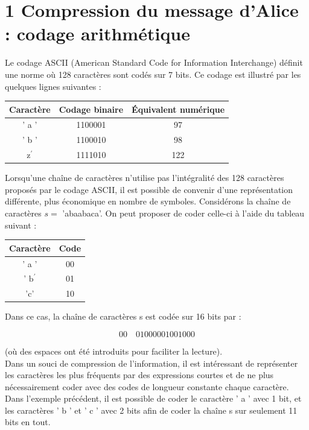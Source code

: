 \documentclass[10pt]{article}
\begin{document}
\section*{1 Compression du message d'Alice : codage arithmétique}
Le codage ASCII (American Standard Code for Information Interchange) définit une norme où 128 caractères sont codés sur 7 bits. Ce codage est illustré par les quelques lignes suivantes :

\begin{center}
\begin{tabular}{|c|c|c|}
\hline
Caractère & Codage binaire & Équivalent numérique \\
\hline
' a ' & 1100001 & 97 \\
\hline
' b ' & 1100010 & 98 \\
\hline
$\mathrm{z}^{\prime}$ & 1111010 & 122 \\
\hline
\end{tabular}
\end{center}

Lorsqu'une chaîne de caractères n'utilise pas l'intégralité des 128 caractères proposés par le codage ASCII, il est possible de convenir d'une représentation différente, plus économique en nombre de symboles. Considérons la chaîne de caractères $s=$ 'abaabaca'. On peut proposer de coder celle-ci à l'aide du tableau suivant :

\begin{center}
\begin{tabular}{|c|c|}
\hline
Caractère & Code \\
\hline
' a ' & 00 \\
\hline
' $\mathrm{b}^{\prime}$ & 01 \\
\hline
'c' & 10 \\
\hline
\end{tabular}
\end{center}

Dans ce cas, la chaîne de caractères s est codée sur 16 bits par :

$$
00 \quad 01000001001000
$$

(où des espaces ont été introduits pour faciliter la lecture).\\
Dans un souci de compression de l'information, il est intéressant de représenter les caractères les plus fréquents par des expressions courtes et de ne plus nécessairement coder avec des codes de longueur constante chaque caractère. Dans l'exemple précédent, il est possible de coder le caractère ' a ' avec 1 bit, et les caractères ' b ' et ' c ' avec 2 bits afin de coder la chaîne s sur seulement 11 bits en tout.
\end{document}
